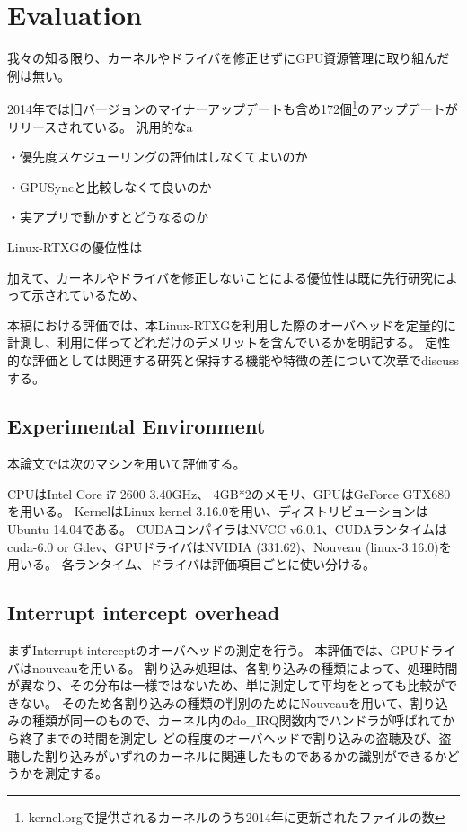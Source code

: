 \section{Evaluation}
我々の知る限り、カーネルやドライバを修正せずにGPU資源管理に取り組んだ例は無い。

2014年では旧バージョンのマイナーアップデートも含め172個\footnote{kernel.orgで提供されるカーネルのうち2014年に更新されたファイルの数}のアップデートがリリースされている。
汎用的なa


・優先度スケジューリングの評価はしなくてよいのか

・GPUSyncと比較しなくて良いのか

・実アプリで動かすとどうなるのか


Linux-RTXGの優位性は

加えて、カーネルやドライバを修正しないことによる優位性は既に先行研究\cite{resch}によって示されているため、


本稿における評価では、本Linux-RTXGを利用した際のオーバヘッドを定量的に計測し、利用に伴ってどれだけのデメリットを含んでいるかを明記する。
定性的な評価としては関連する研究と保持する機能や特徴の差について次章でdiscussする。

\subsection{Experimental Environment}
本論文では次のマシンを用いて評価する。

CPUはIntel Core i7 2600 3.40GHz、
4GB*2のメモリ、GPUはGeForce GTX680を用いる。
KernelはLinux kernel 3.16.0を用い、ディストリビューションはUbuntu 14.04である。
CUDAコンパイラはNVCC v6.0.1、CUDAランタイムはcuda-6.0 or Gdev、GPUドライバはNVIDIA (331.62)、Nouveau (linux-3.16.0)を用いる。
各ランタイム、ドライバは評価項目ごとに使い分ける。

\subsection{Interrupt intercept overhead}
まずInterrupt interceptのオーバヘッドの測定を行う。
本評価では、GPUドライバはnouveauを用いる。
割り込み処理は、各割り込みの種類によって、処理時間が異なり、その分布は一様ではないため、単に測定して平均をとっても比較ができない。
そのため各割り込みの種類の判別のためにNouveauを用いて、割り込みの種類が同一のもので、カーネル内のdo\_IRQ関数内でハンドラが呼ばれてから終了までの時間を測定し
どの程度のオーバヘッドで割り込みの盗聴及び、盗聴した割り込みがいずれのカーネルに関連したものであるかの識別ができるかどうかを測定する。

